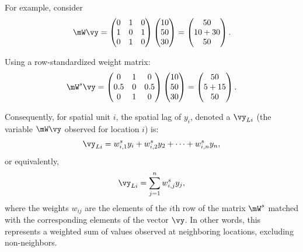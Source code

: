 For example, consider 
\begin{equation*}
  \mW\vy =    \begin{pmatrix}
     0 & 1 & 0 \\
     1 & 0 & 1 \\
     0 & 1 & 0
  \end{pmatrix}
  \begin{pmatrix}
     10 \\
     50 \\
     30
  \end{pmatrix} =
  \begin{pmatrix}
     50 \\
     10 + 30 \\
     50
  \end{pmatrix}.
\end{equation*}

Using a row-standardized weight matrix:
\begin{equation*}
  \mW^s\vy =    \begin{pmatrix}
     0 & 1 & 0 \\
     0.5 & 0 & 0.5 \\
     0 & 1 & 0
  \end{pmatrix}
  \begin{pmatrix}
     10 \\
     50 \\
     30
  \end{pmatrix} =
  \begin{pmatrix}
     50 \\
     5 + 15 \\
     50
  \end{pmatrix}.
\end{equation*}

Consequently, for spatial unit $i$, the spatial lag of $y_i$, denoted a $\vy_{Li}$ (the variable $\mW\vy$ observed for location $i$) is:
\begin{equation*}
  \vy_{Li} = w_{i, 1}^sy_i + w_{i, 2}^sy_2 + \cdots + w_{i, n}^sy_n, 
\end{equation*}
%
or equivalently,
\begin{equation*}
  \vy_{Li} = \sum_{j = 1}^nw_{i,j}^sy_j,
\end{equation*}
%
where the weights $w_{ij}$ are the elements of the $i$th row of the matrix $\mW^s$ matched with the corresponding elements of the vector $\vy$. In other words, this represents a weighted sum of values observed at neighboring locations, excluding non-neighbors.

